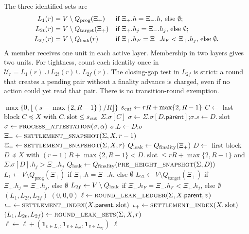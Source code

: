 \documentclass{article}
\theoremstyle{plain}
\theoremstyle{definition}
\theoremstyle{remark}
\newcommand{\genesis}{B_{\mathrm{gen}}}
\newcommand{\slot}{\operatorname{slot}}
\newcommand{\parent}{\mathsf{parent}}
\newcommand{\attsf}{\mathsf{attestations}}
\newcommand{\Qtarget}{Q_{\mathrm{target}}}
\newcommand{\Qprog}{Q_{\mathrm{prog}}}
\newcommand{\Qfin}{Q_{\mathrm{finality}}}
\begin{document}
The three identified sets are
\[
\begin{aligned}
 L_1(r)&=V\setminus\Qprog(\Xi_+)
   &&\text{if $\Xi_+.h=\Xi_-.h$, else $\emptyset$;}\\
 L_{2t}(r)&=V\setminus\Qtarget(\Xi_+)
   &&\text{if $\Xi_+.h_j=\Xi_-.h_j$, else $\emptyset$;}\\
 L_{2f}(r)&=V\setminus Q_{\rm leak}(r)
   &&\text{if $\Xi_+.h_F=\Xi_-.h_F<\Xi_+.h_j$, else $\emptyset$.}
\end{aligned}
\]
A member receives one unit in each active layer.  Membership in two
layers gives two units.  For tightness, count each identity once in
$\mathcal U_r=L_1(r)\cup L_{2t}(r)\cup L_{2f}(r)$.
The closing-gap test in $L_{2f}$ is strict: a round that creates a
pending pair without a finality advance is charged, even if no action
could yet read that pair.  There is no transition-round exemption.

\label{alg:leak}
\nopagebreak
{\footnotesize
\begin{algorithmic}[1]
  \State \Return $\max\{0,\lfloor(s-\max\{2,R-1\})/R\rfloor\}$
\EndFunction
{}
  \State $s_{\rm cut}\gets rR+\max\{2,R-1\}$
  \State $C\gets$ last block $C\preceq X$ with $C.\slot\leq s_{\rm cut}$
  \State \Return $\Sigma.\sigma[C]$
\EndFunction
{}
  \State $\sigma\gets\Sigma.\sigma[D.\parent]$;\quad $\sigma.s\gets D.\slot$
  \ForAll{$\alpha\in D.\attsf$}
    \State $\sigma\gets\Call{process\_attestation}{\sigma,\alpha}$
  \EndFor
  \State $\sigma.L\gets D$;\quad \Return $\sigma$
\EndFunction
{}
  \State $\Xi_-\gets\Call{settlement\_snapshot}{\Sigma,X,r-1}$
  \State $\Xi_+\gets\Call{settlement\_snapshot}{\Sigma,X,r}$
  \State $Q_{\rm leak}\gets\Qfin(\Xi_+)$
    \State $D\gets$ first block $D\preceq X$ with
      $(r-1)R+\max\{2,R-1\}<D.\slot\leq rR+\max\{2,R-1\}$
      and $\Sigma.\sigma[D].h_j>\Xi_-.h_j$
    \State $Q_{\rm leak}\gets\Qfin(\Call{pre\_height\_snapshot}{\Sigma,D})$
  \EndIf
  \State $L_1\gets V\setminus\Qprog(\Xi_+)$ if $\Xi_+.h=\Xi_-.h$, else $\emptyset$
  \State $L_{2t}\gets V\setminus\Qtarget(\Xi_+)$ if $\Xi_+.h_j=\Xi_-.h_j$, else $\emptyset$
  \State $L_{2f}\gets V\setminus Q_{\rm leak}$ if $\Xi_+.h_F=\Xi_-.h_F<\Xi_+.h_j$, else $\emptyset$
  \State \Return $(L_1,L_{2t},L_{2f})$
\EndFunction
{}
  \If{$X=\genesis$} \State \Return $(0,0,0)$ \EndIf
  \State $\ell\gets\Call{round\_leak\_ledger}{\Sigma,X.\parent,v}$
  \State $\iota_-\gets\Call{settlement\_index}{X.\parent.\slot}$
  \State $\iota_+\gets\Call{settlement\_index}{X.\slot}$
    \State $(L_1,L_{2t},L_{2f})\gets\Call{round\_leak\_sets}{\Sigma,X,r}$
    \State $\ell\gets\ell+(\mathbf1_{v\in L_1},\mathbf1_{v\in L_{2t}},
      \mathbf1_{v\in L_{2f}})$
  \EndFor
  \State \Return $\ell$
\EndFunction
\end{algorithmic}
}
\end{document}
